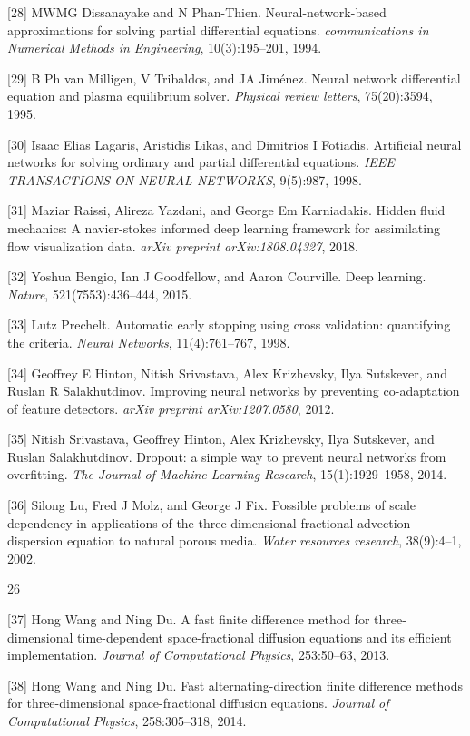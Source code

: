 \documentclass[UTF8]{article}
\begin{document}
[28] MWMG Dissanayake and N Phan-Thien. Neural-network-based approximations for solving partial differential equations. \textit{communications in Numerical Methods in Engineering}, 10(3):195--201, 1994.

[29] B Ph van Milligen, V Tribaldos, and JA Jiménez. Neural network differential equation and plasma equilibrium solver. \textit{Physical review letters}, 75(20):3594, 1995.

[30] Isaac Elias Lagaris, Aristidis Likas, and Dimitrios I Fotiadis. Artificial neural networks for solving ordinary and partial differential equations. \textit{IEEE TRANSACTIONS ON NEURAL NETWORKS}, 9(5):987, 1998.

[31] Maziar Raissi, Alireza Yazdani, and George Em Karniadakis. Hidden fluid mechanics: A navier-stokes informed deep learning framework for assimilating flow visualization data. \textit{arXiv preprint arXiv:1808.04327}, 2018.

[32] Yoshua Bengio, Ian J Goodfellow, and Aaron Courville. Deep learning. \textit{Nature}, 521(7553):436--444, 2015.

[33] Lutz Prechelt. Automatic early stopping using cross validation: quantifying the criteria. \textit{Neural Networks}, 11(4):761--767, 1998.

[34] Geoffrey E Hinton, Nitish Srivastava, Alex Krizhevsky, Ilya Sutskever, and Ruslan R Salakhutdinov. Improving neural networks by preventing co-adaptation of feature detectors. \textit{arXiv preprint arXiv:1207.0580}, 2012.

[35] Nitish Srivastava, Geoffrey Hinton, Alex Krizhevsky, Ilya Sutskever, and Ruslan Salakhutdinov. Dropout: a simple way to prevent neural networks from overfitting. \textit{The Journal of Machine Learning Research}, 15(1):1929--1958, 2014.

[36] Silong Lu, Fred J Molz, and George J Fix. Possible problems of scale dependency in applications of the three-dimensional fractional advection-dispersion equation to natural porous media. \textit{Water resources research}, 38(9):4--1, 2002.

26

[37] Hong Wang and Ning Du. A fast finite difference method for three-dimensional time-dependent space-fractional diffusion equations and its efficient implementation. \textit{Journal of Computational Physics}, 253:50--63, 2013.

[38] Hong Wang and Ning Du. Fast alternating-direction finite difference methods for three-dimensional space-fractional diffusion equations. \textit{Journal of Computational Physics}, 258:305--318, 2014.
\end{document}

